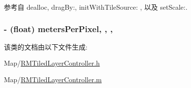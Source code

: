 参考自 dealloc, drag\-By\-:, init\-With\-Tile\-Source\-: , 以及 set\-Scale\-:.

\hypertarget{interface_r_m_tiled_layer_controller_ae80e5444b62b79a5a92af429f015d1ea}{
\subsubsection[{meters\-Per\-Pixel}]{\setlength{\rightskip}{0pt plus 5cm}-\/ (float) meters\-Per\-Pixel\hspace{0.3cm}{\ttfamily [read]}, {\ttfamily [write]}, {\ttfamily [nonatomic]}, {\ttfamily [assign]}}}\label{interface_r_m_tiled_layer_controller_ae80e5444b62b79a5a92af429f015d1ea}


该类的文档由以下文件生成\-:\begin{DoxyCompactItemize}
\item 
Map/\hyperlink{_r_m_tiled_layer_controller_8h}{R\-M\-Tiled\-Layer\-Controller.\-h}\item 
Map/\hyperlink{_r_m_tiled_layer_controller_8m}{R\-M\-Tiled\-Layer\-Controller.\-m}\end{DoxyCompactItemize}

